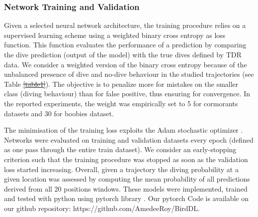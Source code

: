 \documentclass{article}
\providecommand{\DIFaddtex}[1]{{\protect\color{blue}\uwave{#1}}} %
\providecommand{\DIFdeltex}[1]{{\protect\color{red}\sout{#1}}}                      %
\providecommand{\DIFaddbegin}{} %
\providecommand{\DIFaddend}{} %
\providecommand{\DIFdelbegin}{} %
\providecommand{\DIFdelend}{} %
\providecommand{\DIFadd}[1]{\texorpdfstring{\DIFaddtex{#1}}{#1}} %
\providecommand{\DIFdel}[1]{\texorpdfstring{\DIFdeltex{#1}}{}} %
\newcommand{\DIFscaledelfig}{0.5}
\newlength{\DIFdelgraphicswidth} %
\newlength{\DIFdelgraphicsheight} %
\newcommand{\DIFaddincludegraphics}[2][]{{\color{blue}\fbox{\DIFOincludegraphics[#1]{#2}}}} %
\newcommand{\DIFdelincludegraphics}[2][]{%
\sbox{\DIFdelgraphicsbox}{\DIFOincludegraphics[#1]{#2}}%
\settoboxwidth{\DIFdelgraphicswidth}{\DIFdelgraphicsbox} %
\settoboxtotalheight{\DIFdelgraphicsheight}{\DIFdelgraphicsbox} %
\scalebox{\DIFscaledelfig}{%
\parbox[b]{\DIFdelgraphicswidth}{\usebox{\DIFdelgraphicsbox}\\[-\baselineskip] \rule{\DIFdelgraphicswidth}{0em}}\llap{\resizebox{\DIFdelgraphicswidth}{\DIFdelgraphicsheight}{%
\setlength{\unitlength}{\DIFdelgraphicswidth}%
\begin{picture}(1,1)%
\thicklines\linethickness{2pt} %
{\color[rgb]{1,0,0}\put(0,0){\framebox(1,1){}}}%
{\color[rgb]{1,0,0}\put(0,0){\line( 1,1){1}}}%
{\color[rgb]{1,0,0}\put(0,1){\line(1,-1){1}}}%
\end{picture}%
}\hspace*{3pt}}} %
} %
\DeclareRobustCommand{\DIFaddbegin}{\DIFOaddbegin \let\includegraphics\DIFaddincludegraphics} %
\DeclareRobustCommand{\DIFaddend}{\DIFOaddend \let\includegraphics\DIFOincludegraphics} %
\DeclareRobustCommand{\DIFdelbegin}{\DIFOdelbegin \let\includegraphics\DIFdelincludegraphics} %
\DeclareRobustCommand{\DIFdelend}{\DIFOaddend \let\includegraphics\DIFOincludegraphics} %
\begin{document}
\subsubsection{Network Training and Validation}
Given a selected neural network architecture, the training procedure relies on a supervised learning scheme using a weighted binary cross entropy as loss function. This function evaluates the performance of a prediction by comparing the dive prediction (output of the model) with the true dives defined by TDR data. We consider a weighted version of the binary cross entropy because of the unbalanced presence of dive and no-dive behaviour in the studied trajectories (see Table \DIFdelbegin \DIFdel{\ref{table1}}\DIFdelend \DIFaddbegin \DIFadd{\ref{table_data}}\DIFaddend ). The objective is to penalize more for mistakes on the smaller class (diving behaviour) than for false positive, thus ensuring for convergence. In the reported experiments, the weight was empirically set to 5 for cormorants datasets and 30 for boobies dataset.

The minimisation of the training loss exploits the Adam stochastic optimizer \cite{kingma_adam_2014}. Networks were evaluated on training and validation datasets every epoch (defined as one pass through the entire train dataset). We consider an early-stopping criterion such that the training procedure was stopped as soon as the validation loss started increasing. Overall, given a trajectory the diving probability at a given location was assessed by computing the mean probability of all predictions derived from all 20 positions windows. These models were implemented, trained and tested with python using pytorch library \cite{paskze_pytorch_2019}. Our pytorch Code is available on our github repository: https://github.com/AmedeeRoy/BirdDL.
\end{document}
